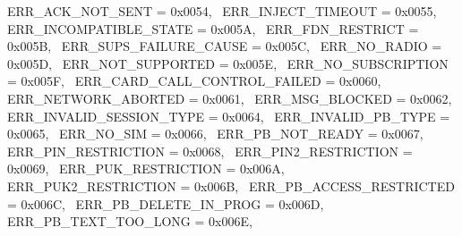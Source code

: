 \begin{DoxyItemize}
 E\+R\+R\+\_\+\+A\+C\+K\+\_\+\+N\+O\+T\+\_\+\+S\+E\+NT = 0x0054,~\newline
 E\+R\+R\+\_\+\+I\+N\+J\+E\+C\+T\+\_\+\+T\+I\+M\+E\+O\+UT = 0x0055,~\newline
 E\+R\+R\+\_\+\+I\+N\+C\+O\+M\+P\+A\+T\+I\+B\+L\+E\+\_\+\+S\+T\+A\+TE = 0x005A,~\newline
 E\+R\+R\+\_\+\+F\+D\+N\+\_\+\+R\+E\+S\+T\+R\+I\+CT = 0x005B,~\newline
 E\+R\+R\+\_\+\+S\+U\+P\+S\+\_\+\+F\+A\+I\+L\+U\+R\+E\+\_\+\+C\+A\+U\+SE = 0x005C,~\newline
 E\+R\+R\+\_\+\+N\+O\+\_\+\+R\+A\+D\+IO = 0x005D,~\newline
 E\+R\+R\+\_\+\+N\+O\+T\+\_\+\+S\+U\+P\+P\+O\+R\+T\+ED = 0x005E,~\newline
 E\+R\+R\+\_\+\+N\+O\+\_\+\+S\+U\+B\+S\+C\+R\+I\+P\+T\+I\+ON = 0x005F,~\newline
 E\+R\+R\+\_\+\+C\+A\+R\+D\+\_\+\+C\+A\+L\+L\+\_\+\+C\+O\+N\+T\+R\+O\+L\+\_\+\+F\+A\+I\+L\+ED = 0x0060,~\newline
 E\+R\+R\+\_\+\+N\+E\+T\+W\+O\+R\+K\+\_\+\+A\+B\+O\+R\+T\+ED = 0x0061,~\newline
 E\+R\+R\+\_\+\+M\+S\+G\+\_\+\+B\+L\+O\+C\+K\+ED = 0x0062,~\newline
 E\+R\+R\+\_\+\+I\+N\+V\+A\+L\+I\+D\+\_\+\+S\+E\+S\+S\+I\+O\+N\+\_\+\+T\+Y\+PE = 0x0064,~\newline
 E\+R\+R\+\_\+\+I\+N\+V\+A\+L\+I\+D\+\_\+\+P\+B\+\_\+\+T\+Y\+PE = 0x0065,~\newline
 E\+R\+R\+\_\+\+N\+O\+\_\+\+S\+IM = 0x0066,~\newline
 E\+R\+R\+\_\+\+P\+B\+\_\+\+N\+O\+T\+\_\+\+R\+E\+A\+DY = 0x0067,~\newline
 E\+R\+R\+\_\+\+P\+I\+N\+\_\+\+R\+E\+S\+T\+R\+I\+C\+T\+I\+ON = 0x0068,~\newline
 E\+R\+R\+\_\+\+P\+I\+N2\+\_\+\+R\+E\+S\+T\+R\+I\+C\+T\+I\+ON = 0x0069,~\newline
 E\+R\+R\+\_\+\+P\+U\+K\+\_\+\+R\+E\+S\+T\+R\+I\+C\+T\+I\+ON = 0x006A,~\newline
 E\+R\+R\+\_\+\+P\+U\+K2\+\_\+\+R\+E\+S\+T\+R\+I\+C\+T\+I\+ON = 0x006B,~\newline
 E\+R\+R\+\_\+\+P\+B\+\_\+\+A\+C\+C\+E\+S\+S\+\_\+\+R\+E\+S\+T\+R\+I\+C\+T\+ED = 0x006C,~\newline
 E\+R\+R\+\_\+\+P\+B\+\_\+\+D\+E\+L\+E\+T\+E\+\_\+\+I\+N\+\_\+\+P\+R\+OG = 0x006D,~\newline
 E\+R\+R\+\_\+\+P\+B\+\_\+\+T\+E\+X\+T\+\_\+\+T\+O\+O\+\_\+\+L\+O\+NG = 0x006E,~\newline

\end{DoxyItemize}
